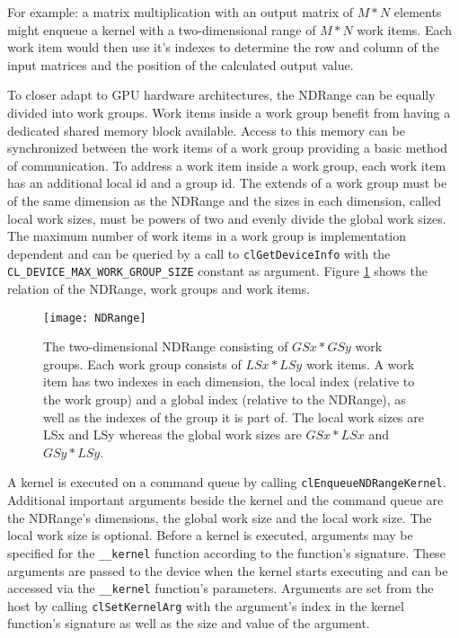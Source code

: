 For example: a matrix multiplication with an output matrix of $M*N$ elements might enqueue a kernel with a two-dimensional range of $M*N$ work items. Each work item would then use it's indexes to determine the row and column of the input matrices and the position of the calculated output value.

To closer adapt to GPU hardware architectures, the NDRange can be equally divided into work groups. Work items inside a work group benefit from having a dedicated shared memory block available. Access to this memory can be synchronized between the work items of a work group providing a basic method of communication. To address a work item inside a work group, each work item has an additional local id and a group id. The extends of a work group must be of the same dimension as the NDRange and the sizes in each dimension, called local work sizes, must be powers of two and evenly divide the global work sizes. \cite[p.18]{opencl_book} The maximum number of work items in a work group is implementation dependent and can be queried by a call to \lstinline!clGetDeviceInfo! with the \lstinline!CL_DEVICE_MAX_WORK_GROUP_SIZE! constant as argument. Figure \ref{fig:NDRange} shows the relation of the NDRange, work groups and work items. 

\begin{figure} 
\centering
\texttt{[image: NDRange]}
\caption{The two-dimensional NDRange consisting of $GSx * GSy$ work groups. Each work group consists of $LSx * LSy$ work items. A work item has two indexes in each dimension, the local index (relative to the work group) and a global index (relative to the NDRange), as well as the indexes of the group it is part of. The local work sizes are LSx and LSy whereas the global work sizes are $GSx * LSx$ and $GSy * LSy$.}
\label{fig:NDRange}
\end{figure}

A kernel is executed on a command queue by calling \lstinline!clEnqueueNDRangeKernel!. Additional important arguments beside the kernel and the command queue are the NDRange's dimensions, the global work size and the local work size. The local work size is optional. Before a kernel is executed, arguments may be specified for the \lstinline!__kernel! function according to the function's signature. These arguments are passed to the device when the kernel starts executing and can be accessed via the \lstinline!__kernel! function's parameters. Arguments are set from the host by calling \lstinline!clSetKernelArg! with the argument's index in the kernel function's signature as well as the size and value of the argument.

